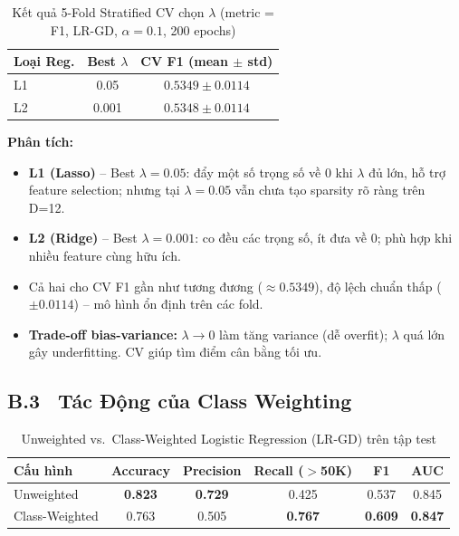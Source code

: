 \documentclass[12pt, a4paper]{article}
\begin{document}
\begin{table}[H]
  \centering
  \caption{Kết quả 5-Fold Stratified CV chọn $\lambda$ (metric = F1, LR-GD, $\alpha=0.1$, 200 epochs)}
  \label{tab:cv_lambda}
  \begin{tabular}{lcc}
    \toprule
    \textbf{Loại Reg.} & \textbf{Best $\lambda$} & \textbf{CV F1 (mean $\pm$ std)} \\
    \midrule
    L1 & 0.05  & $0.5349 \pm 0.0114$ \\
    L2 & 0.001 & $0.5348 \pm 0.0114$ \\
    \bottomrule
  \end{tabular}
\end{table}

\noindent\textbf{Phân tích:}
\begin{itemize}
  \item \textbf{L1 (Lasso)} -- Best $\lambda = 0.05$: đẩy một số trọng số về 0 khi
        $\lambda$ đủ lớn, hỗ trợ feature selection; nhưng tại $\lambda=0.05$ vẫn
        chưa tạo sparsity rõ ràng trên D=12.
  \item \textbf{L2 (Ridge)} -- Best $\lambda = 0.001$: co đều các trọng số, ít
        đưa về 0; phù hợp khi nhiều feature cùng hữu ích.
  \item Cả hai cho CV F1 gần như tương đương ($\approx 0.5349$), độ lệch chuẩn
        thấp ($\pm 0.0114$) -- mô hình ổn định trên các fold.
  \item \textbf{Trade-off bias-variance:} $\lambda \to 0$ làm tăng variance (dễ
        overfit); $\lambda$ quá lớn gây underfitting. CV giúp tìm điểm cân bằng
        tối ưu.
\end{itemize}

\subsection*{B.3 \ Tác Động của Class Weighting}

\begin{table}[H]
  \centering
  \caption{Unweighted vs.\ Class-Weighted Logistic Regression (LR-GD) trên tập test}
  \label{tab:class_weight}
  \begin{tabular}{lccccc}
    \toprule
    \textbf{Cấu hình} & \textbf{Accuracy} & \textbf{Precision} & \textbf{Recall ($>$50K)} & \textbf{F1} & \textbf{AUC} \\
    \midrule
    Unweighted      & \textbf{0.823} & \textbf{0.729} & 0.425 & 0.537 & 0.845 \\
    Class-Weighted  & 0.763          & 0.505          & \textbf{0.767} & \textbf{0.609} & \textbf{0.847} \\
    \bottomrule
  \end{tabular}
\end{table}
\end{document}
